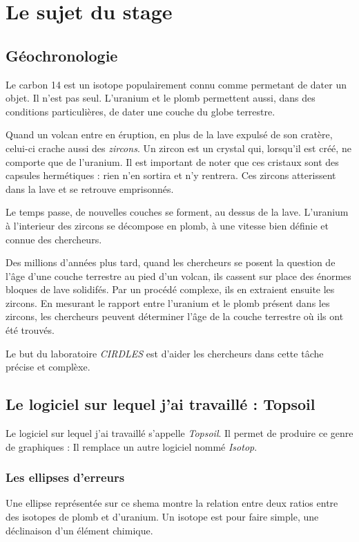 ﻿\chapter{Le sujet du stage}
\section{Géochronologie} %
Le carbon 14 est un isotope populairement connu comme permetant de dater un objet. Il n'est pas seul. L'uranium et le plomb permettent aussi, dans des conditions particulières, de dater une couche du globe terrestre.

Quand un volcan entre en éruption, en plus de la lave expulsé de son cratère, celui-ci crache aussi des \textit{zircons}. Un zircon est un crystal qui, lorsqu'il est créé, ne comporte que de l'uranium. Il est important de noter que ces cristaux sont des capsules hermétiques : rien n'en sortira et n'y rentrera. Ces zircons atterissent dans la lave et se retrouve emprisonnés. 

Le temps passe, de nouvelles couches se forment, au dessus de la lave. L'uranium à l'interieur des zircons se décompose en plomb, à une vitesse bien définie et connue des chercheurs. 

Des millions d'années plus tard, quand les chercheurs se posent la question de l'âge d'une couche terrestre au pied d'un volcan, ils cassent sur place des énormes bloques de lave solidifés. Par un procédé complexe, ils en extraient ensuite les zircons. En mesurant le rapport entre l'uranium et le plomb présent dans les zircons, les chercheurs peuvent déterminer l'âge de la couche terrestre où ils ont été trouvés.

Le but du laboratoire \textit{CIRDLES} est d'aider les chercheurs dans cette tâche précise et complèxe.

\section{Le logiciel sur lequel j'ai travaillé : Topsoil}
Le logiciel sur lequel j'ai travaillé s'appelle \textit{Topsoil}. Il permet de produire ce genre de graphiques :
Il remplace un autre logiciel nommé \textit{Isotop}.

\subsection{Les ellipses d'erreurs}
Une ellipse représentée sur ce shema montre la relation entre deux ratios entre des isotopes de plomb et d'uranium. Un isotope est pour faire simple, une déclinaison d'un élément chimique.\\

